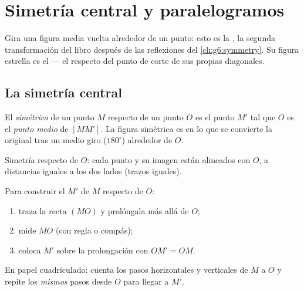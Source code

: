 \chapter{Simetría central y paralelogramos}\label{ch:g7:central}

Gira una figura media vuelta alrededor de un punto: esto es la \emph{}, la segunda transformación del libro después de las reflexiones
del \cref{ch:g6:symmetry}. Su figura estrella es el  --- el
  respecto del punto de corte de sus propias
diagonales.

\section{La simetría central}

\begin{definition}\label{def:g7:central:def}
El \emph{simétrico} de un punto $M$ respecto de un
punto $O$ es el punto $M'$ tal que $O$ es el \emph{punto medio} de
$[MM']$. La figura simétrica es en lo que se convierte la original tras un
medio giro ($180^\circ$) alrededor de $O$.
\end{definition}

\begin{omfigure}

{\small Simetría respecto de $O$: cada punto y su imagen están alineados con
$O$, a distancias iguales a los dos lados (trazos iguales).}
\end{omfigure}

\begin{method}\label{met:g7:central:construct}
Para construir el  $M'$ de $M$ respecto de $O$:
\begin{enumerate}
  \item traza la recta $(MO)$ y prolóngala más allá de $O$;
  \item mide $MO$ (con regla o compás);
  \item coloca $M'$ sobre la prolongación con $OM' = OM$.
\end{enumerate}
En papel cuadriculado: cuenta los pasos horizontales y verticales de $M$ a
$O$ y repite los \emph{mismos} pasos desde $O$ para llegar a $M'$.
\end{method}

